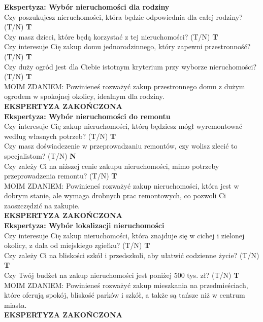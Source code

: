 \noindent \textbf{Ekspertyza: Wybór nieruchomości dla rodziny}\\
\noindent Czy poszukujesz nieruchomości, która będzie odpowiednia dla całej rodziny? (T/N) \textbf{T} \\
\noindent Czy masz dzieci, które będą korzystać z tej nieruchomości? (T/N) \textbf{T} \\
\noindent Czy interesuje Cię zakup domu jednorodzinnego, który zapewni przestronność? (T/N) \textbf{T} \\
\noindent Czy duży ogród jest dla Ciebie istotnym kryterium przy wyborze nieruchomości? (T/N) \textbf{T} \\
MOIM ZDANIEM: Powinieneś rozważyć zakup przestronnego domu z dużym ogrodem w spokojnej okolicy, idealnym dla rodziny.\\
\textbf{EKSPERTYZA ZAKOŃCZONA}\\

\noindent \textbf{Ekspertyza: Wybór nieruchomości do remontu}\\
\noindent Czy interesuje Cię zakup nieruchomości, którą będziesz mógł wyremontować według własnych potrzeb? (T/N) \textbf{T} \\
\noindent Czy masz doświadczenie w przeprowadzaniu remontów, czy wolisz zlecić to specjalistom? (T/N) \textbf{N} \\
\noindent Czy zależy Ci na niższej cenie zakupu nieruchomości, mimo potrzeby przeprowadzenia remontu? (T/N) \textbf{T} \\
MOIM ZDANIEM: Powinieneś rozważyć zakup nieruchomości, która jest w dobrym stanie, ale wymaga drobnych prac remontowych, co pozwoli Ci zaoszczędzić na zakupie.\\
\textbf{EKSPERTYZA ZAKOŃCZONA}\\

\noindent \textbf{Ekspertyza: Wybór lokalizacji nieruchomości}\\
\noindent Czy interesuje Cię zakup nieruchomości, która znajduje się w cichej i zielonej okolicy, z dala od miejskiego zgiełku? (T/N) \textbf{T} \\
\noindent Czy zależy Ci na bliskości szkół i przedszkoli, aby ułatwić codzienne życie? (T/N) \textbf{T} \\
\noindent Czy Twój budżet na zakup nieruchomości jest poniżej 500 tys. zł? (T/N) \textbf{T} \\
MOIM ZDANIEM: Powinieneś rozważyć zakup mieszkania na przedmieściach, które oferują spokój, bliskość parków i szkół, a także są tańsze niż w centrum miasta.\\
\textbf{EKSPERTYZA ZAKOŃCZONA}\\

